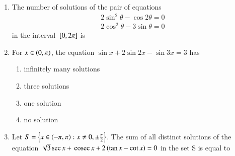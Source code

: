 \begin{enumerate}[label=\thesubsection.\arabic*,ref=\thesubsection.\theenumi]
\hfill{}
\begin{enumerate}
\end{enumerate}
\item The number of solutions of the pair of equations
\begin{align*}
2\sin^2\theta - \cos2\theta = 0\\
2\cos^2\theta - 3\sin\theta = 0
\end{align*}
in the interval ${}\left[0,2\pi\right]$ is
\hfill{}
\begin{enumerate}
\end{enumerate}
\item For $x \in \left(0,\pi\right)$, the equation $\sin x + 2\sin 2x - \sin 3x = 3$ has
\hfill{}
\begin{enumerate}
\item infinitely many solutions
\item three solutions
\item one solution
\item no solution
\end{enumerate}
\item Let $S = \left\{x \in \left(-\pi,\pi\right) : x \neq 0, \pm \frac{\pi}{2}\right\}$. The sum of all distinct solutions of the equation $\sqrt{3} \sec x + \,\text{cosec}\, x + 2\left(\tan x - \cot x\right) = 0$ in the set S is equal to
\hfill{}
\begin{enumerate}

\end{enumerate}
\end{enumerate}

